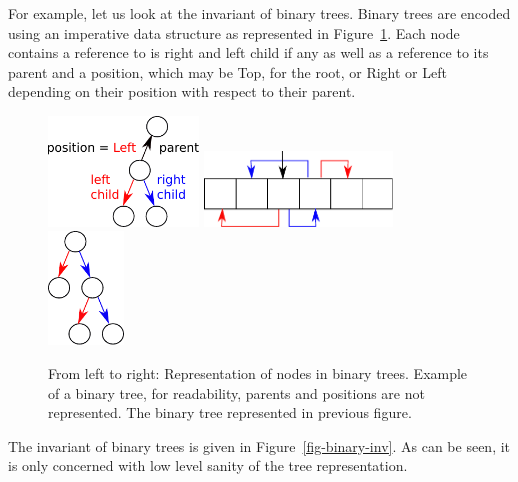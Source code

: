 \documentclass[11pt,a4paper]{article}
\begin{document}
For example, let us look at the invariant of binary trees. Binary trees are
encoded using an imperative data structure as represented in Figure~\ref{fig-binary}.
Each node contains a reference to is right and left child if any as well as a
reference to its parent and a position, which may be Top, for the root, or
Right or Left depending on their position with respect to their parent.

\begin{figure}[ht]
\begin{center}
\includegraphics[width=4cm]{tree_structure.pdf}\hfill
\includegraphics[width=5cm]{binary_1.pdf}\hfill
\includegraphics[width=2cm]{binary_2.pdf}
\caption{\label{fig-binary} From left to right: Representation of nodes in binary trees.
Example of a binary tree, for readability, parents and positions are not represented.
The binary tree represented in previous figure.}
\end{center}
\end{figure}

The invariant of binary trees is given in Figure~\ref{fig-binary-inv}.
As can be seen, it is only concerned with low level sanity of the
tree representation.
\end{document}
